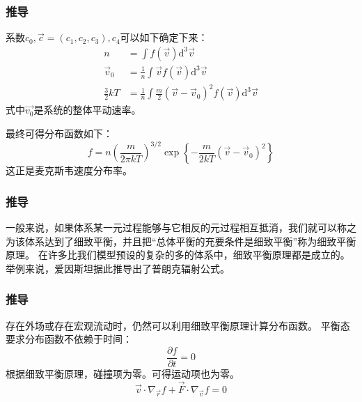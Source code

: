 \documentclass{if-beamer}
\begin{document}
\begin{frame}
    \frametitle{推导}
        \begin{block}{}
            系数$c_0,\vec{c}=(c_1,c_2,c_3),c_4$可以如下确定下来：
            \begin{equation*}
                \begin{aligned}
                n&=\int f(\vec{v}) \mathrm{d}^{3} \vec{v}\\ 
                \vec{v}_{0}&=\frac{1}{n} \int \vec{v} f(\vec{v}) \mathrm{d}^{3} \vec{v}\\ 
                \frac{3}{2} k T&=\frac{1}{n} \int \frac{m}{2}\left(\vec{v}-\vec{v}_{0}\right)^{2} f(\vec{v}) \mathrm{d}^{3} \vec{v}
                \end{aligned}
            \end{equation*}
        式中$\vec{v_0}$是系统的整体平动速率。
        \end{block}
        \begin{block}{}
        最终可得分布函数如下：
        \begin{equation*}
            f=n\left(\frac{m}{2 \pi k T}\right)^{3 / 2} \exp \left\{-\frac{m}{2 k T}\left(\vec{v}-\vec{v}_{0}\right)^{2}\right\}
        \end{equation*}
        这正是麦克斯韦速度分布率。
        \end{block}
    

\end{frame}
\begin{frame}
    \frametitle{推导}
一般来说，如果体系某一元过程能够与它相反的元过程相互抵消，我们就可以称之为该体系达到了细致平衡，并且把“总体平衡的充要条件是细致平衡”称为细致平衡原理。
在许多比我们模型预设的复杂的多的体系中，细致平衡原理都是成立的。举例来说，爱因斯坦据此推导出了普朗克辐射公式。
    

\end{frame}
\begin{frame}
    \frametitle{推导}
    \begin{block}
        {存在外场或存在宏观流动时，仍然可以利用细致平衡原理计算分布函数。}
            平衡态要求分布函数不依赖于时间：
            \begin{equation*}
                \frac{\partial f}{\partial{t}}=0
            \end{equation*}
            根据细致平衡原理，碰撞项为零。可得运动项也为零。
            \begin{equation*}
                \vec{v}\cdot\nabla_{\vec{r}}{f}+\vec{F}\cdot\nabla_{\vec{v}}{f}=0
            \end{equation*}
    \end{block}


\end{frame}
    
\end{document}
